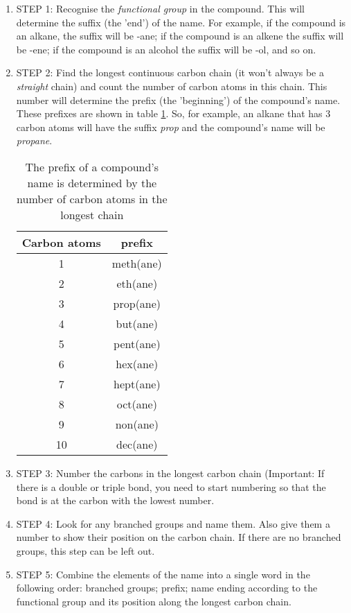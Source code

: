 \begin{enumerate}
\item{STEP 1: Recognise the \textit{functional group} in the compound. This will determine the suffix (the 'end') of the name. For example, if the compound is an alkane, the suffix will be -ane; if the compound is an alkene the suffix will be -ene; if the compound is an alcohol the suffix will be -ol, and so on.}
\item{STEP 2: Find the longest continuous carbon chain (it won't always be a \textit{straight} chain) and count the number of carbon atoms in this chain. This number will determine the prefix (the 'beginning') of the compound's name. These prefixes are shown in table \ref{tab:prefix}. So, for example, an alkane that has 3 carbon atoms will have the suffix \textit{prop} and the compound's name will be \textit{propane}.

\begin{table}[!h]
\begin{center}
\begin{tabular}{|c|c|}\hline
\textbf{Carbon atoms} & prefix \\\hline

1 & meth(ane)\\\hline
2 & eth(ane)\\\hline
3 & prop(ane)\\\hline
4 & but(ane) \\\hline
5 & pent(ane) \\\hline
6 & hex(ane) \\\hline
7 & hept(ane) \\\hline
8 & oct(ane) \\\hline
9 & non(ane) \\\hline
10 & dec(ane) \\\hline
\end{tabular}
\end{center}
\caption{The prefix of a compound's name is determined by the number of carbon atoms in the longest chain}
\label{tab:prefix}
\end{table}
}
\item{STEP 3: Number the carbons in the longest carbon chain (Important: If there is a double or triple bond, you need to start numbering so that the bond is at the carbon with the lowest number.}
\item{STEP 4: Look for any branched groups and name them. Also give them a number to show their position on the carbon chain. If there are no branched groups, this step can be left out.}
\item{STEP 5: Combine the elements of the name into a single word in the following order: branched groups; prefix; name ending according to the functional group and its position along the longest carbon chain.}
\end{enumerate}

